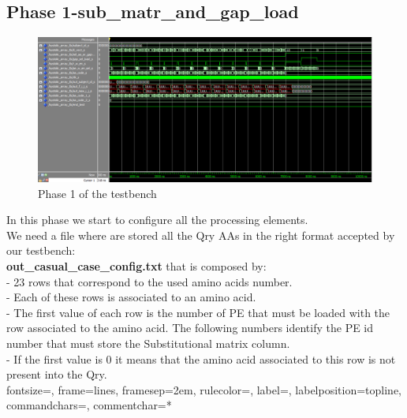 \subsection{Phase 1-sub\_matr\_and\_gap\_load }
\begin{figure}[h!]
	\centering
	\includegraphics[width=\textwidth]{imm/sw/configuration_phase.png} 	\caption{Phase 1 of the testbench} 
	\label{tb_sw_1}
\end{figure}
In this phase we start to configure all the processing elements.\\
We need a file where are stored all the Qry AAs in the right format accepted by our testbench:\\
\textbf{out\_casual\_case\_config.txt} that is composed by:\\
- 23 rows that correspond to the used amino acids number. \\
- Each of these rows is associated to an amino acid. \\
- The first value of each row is the number of PE that must be loaded with the row associated to the amino acid. The following numbers identify the PE id number that must store the Substitutional matrix column. \\
- If the first value is 0 it means that the amino acid associated to this row is not present into the Qry.\\
%
{fontsize=\footnotesize,
	frame=lines,  %
	framesep=2em, %
	rulecolor=\color{Gray},
	label=,
	labelposition=topline,
	commandchars=\|\(\), %
	commentchar=*        %
}

